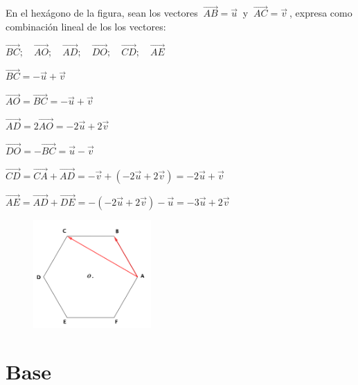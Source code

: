 \vspace{5mm}

\begin{miejemplo}

En el hexágono de la figura, sean los vectores $\ \overrightarrow{AB} = \vec u \ $ y $\ \overrightarrow{AC} = \vec v \ $, expresa como combinación lineal de los los vectores:
\begin{multicols}{2}

\vspace{2mm}$\overrightarrow{BC};\quad \overrightarrow{AO};\quad \overrightarrow{AD};\quad \overrightarrow{DO};\quad \overrightarrow{CD};\quad \overrightarrow{AE}$

\vspace{4mm} $\overrightarrow{BC}=-\vec u + \vec v$

\vspace{2mm} $\overrightarrow{AO}=\overrightarrow{BC}=-\vec u + \vec v$

\vspace{2mm} $\overrightarrow{AD}=2\overrightarrow{AO}=-2\vec u + 2\vec v$

\vspace{2mm} $\overrightarrow{DO}=-\overrightarrow{BC}=\vec u - \vec v$

\vspace{2mm} $\overrightarrow{CD}=\overrightarrow{CA}+\overrightarrow{AD}=-\vec v +(-2\vec u+2 \vec v)=-2\vec u+\vec v$

\vspace{2mm} $\overrightarrow{AE}=\overrightarrow{AD}+\overrightarrow{DE}=-(-2\vec u+2 \vec v)-\vec u=-3\vec u+2\vec v$
\begin{figure}[H]
	\centering
	\includegraphics[width=0.4\textwidth]{img-vec/vec08.png}	
\end{figure}	
\end{multicols}
\end{miejemplo}

\vspace{5mm}
\section{Base}
\vspace{0.5cm}	

